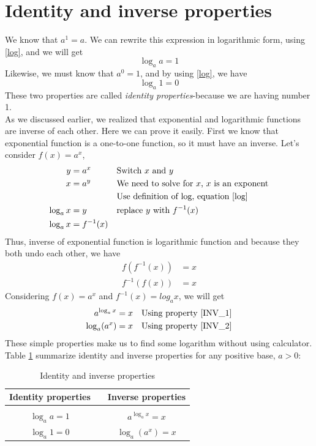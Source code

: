 \section{Identity and inverse properties}
We know that $a^1=a$. We can rewrite this expression in logarithmic form, using
\eqref{log}, and we will get \begin{equation}
								\log_{a}a=1 \label{ID_1}					
							\end{equation}
Likewise, we must know that $a^0=1$, and by using \eqref{log}, we have 
							\begin{equation}
								\log_{a}1=0 \label{ID_2}
							\end{equation}
These two properties are called \textit{identity properties}-because we are having number 
1.\\
As we discussed earlier, we realized that exponential and logarithmic functions are
inverse of each other. Here we can prove it easily. First we know that exponential 
function is a one-to-one function, so it must have an inverse. Let's consider $f(x)=a^x$,
		\begin{align*}
		y &= a^x	&	&\text{Switch $x$ and $y$}\\
		x &= a^y	&	&\text{We need to solve for $x$, $x$ is an exponent}\\
		&&&\text{Use definition of log, equation \eqref{log}}\\
		\log_{a}x&=y	&	&\text{replace $y$ with $f^{-1}(x)$}\\
		\log_{a}x&=f^{-1}(x)	& &\text{}
		\end{align*}
Thus, inverse of exponential function is logarithmic function and because they both undo 
each other, we have
		\begin{align}
		f\left(f^{-1}\left(x\right)\right) &= x \label{INV_1} \\
		f^{-1}\left(f\left(x\right)\right) &= x \label{INV_2}	
		\end{align}
Considering $f(x)=a^x$ and $f^{-1}(x)=log_{a}x$, we will get
		\begin{align}
		a^{\log_{a}x} &= x \label{alogax} & &\text{Using property \eqref{INV_1}}\\
		\log_{a}(a^{x}) &= x \label{logaa} & &\text{Using property \eqref{INV_2}}
		\end{align}
%
    These simple properties make us to find some logarithm without using calculator. Table \ref{tab:identity_inverse_table} summarize identity and inverse properties for any positive base, $a>0$:
	\begin{table}[H]
	\centering
	\caption{Identity and inverse properties}
	\begin{tabular}{c c c}
	    \toprule
		Identity properties        & & Inverse properties \\
		\hline \hline\\
		$\log_{a}a=1$	& &	$\displaystyle a^{\log_{a}x} = x$	\\ [.5cm]
		$\log_{a}1=0$	& &	$\displaystyle \log_{a}(a^{x}) = x$ \\[.2cm]
		\bottomrule
	\end{tabular}
	\label{tab:identity_inverse_table}
	\end{table}
